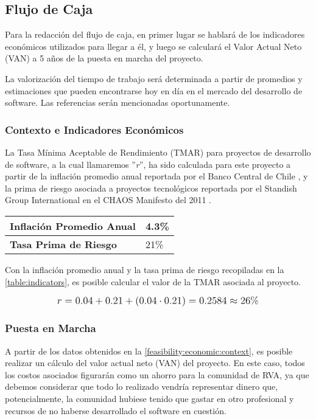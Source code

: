 \subsection{Flujo de Caja}
Para la redacción del flujo de caja, en primer lugar se hablará de los indicadores económicos utilizados para llegar a él, y luego se calculará el Valor Actual Neto (VAN) a 5 años de la puesta en marcha del proyecto.

La valorización del tiempo de trabajo será determinada a partir de promedios y estimaciones que pueden encontrarse hoy en día en el mercado del desarrollo de software. Las referencias serán mencionadas oportunamente.

\subsubsection{Contexto e Indicadores Económicos}
\label{feasibility:economic:context}
La Tasa Mínima Aceptable de Rendimiento (TMAR) para proyectos de desarrollo de software, a la cual llamaremos ''\textit{r}'', ha sido calculada para este proyecto a partir de la inflación promedio anual reportada por el Banco Central de Chile \cite{bancochile}, y la prima de riesgo asociada a proyectos tecnológicos reportada por el Standish Group International en el CHAOS Manifesto del 2011 \cite{big2011chaos}.

\begin{center}
	\begin{tabular}{ | p{7cm} | p{5cm}|}
		\hline
		{\textbf{Inflación Promedio Anual}} & 4.3\%  \\ \hline
		{\textbf{Tasa Prima de Riesgo}} & 21\% \\ \hline
	\end{tabular}

  \label{table:indicators}
\end{center}

Con la inflación promedio anual y la tasa prima de riesgo recopiladas en la \autoref{table:indicators}, es posible calcular el valor de la TMAR asociada al proyecto.

\[
\mathlarger{
  r = 0.04+0.21+(0.04\cdot0.21) = 0.2584 \approx 26\%
}
\]

\subsubsection{Puesta en Marcha}
\label{feasibility:economic:startup}
A partir de los datos obtenidos en la \autoref{feasibility:economic:context}, es posible realizar un cálculo del valor actual neto (VAN) del proyecto. En este caso, todos los costos asociados figurarán como un ahorro para la comunidad de RVA, ya que debemos considerar que todo lo realizado vendría representar dinero que, potencialmente, la comunidad hubiese tenido que gastar en otro profesional y recursos de no haberse desarrollado el software en cuestión.

